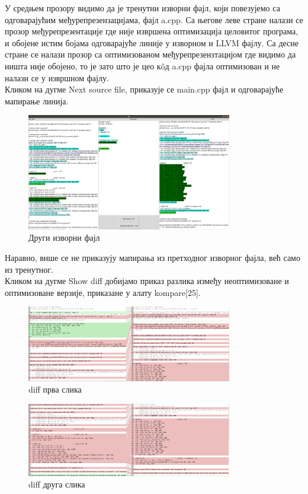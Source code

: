 \documentclass[12pt,oneside]{memoir}
\begin{document}
У средњем прозору видимо да је тренутни изворни фајл, који повезујемо са одговарајућим
међурепрезензацијама, фајл a.cpp.
Са његове леве стране налази се прозор међурепрезентације где није извршена оптимизација
целовитог програма, и обојене истим бојама одговарајуће линије у изворном и
LLVM фајлу.
Са десне стране се налази прозор са оптимизованом међурепрезензтацијом где видимо
да ништа није обојено, то је зато што је цео к\^{o}д  a.cpp фајла оптимизован
и не налази се у извршном фајлу.
\\
Кликом на дугме Next source file, приказује се main.cpp фајл и одговарајуће 
мапирање линија.
\begin{figure}[!ht]
  \centering
  \includegraphics[width=0.8\textwidth]{main_cpp.png}
  \caption{Други изворни фајл }
  \label{fig:grafikon}
\end{figure}
Наравно, више се не приказују мапирања из претходног изворног фајла, већ само из
тренутног.
\\
Кликом на дугме Show diff добијамо приказ разлика између неоптимизоване и оптимизоване
верзије, приказане у алату kompare[25].
\begin{figure}[!ht]
  \centering
  \includegraphics[width=0.8\textwidth]{diff_1.png}
  \caption{diff прва слика }
  \label{fig:grafikon}
\end{figure}
\begin{figure}[!ht]
  \centering
  \includegraphics[width=0.8\textwidth]{diff_2.png}
  \caption{diff друга слика }
  \label{fig:grafikon}
\end{figure}
\end{document}
